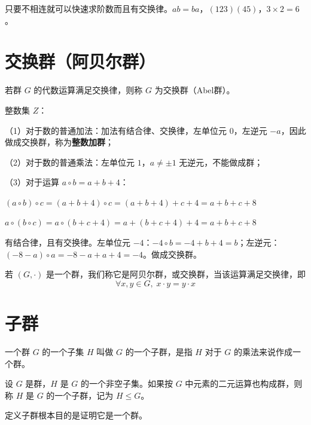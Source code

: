\begin{note}[阶数与奇偶]
只要不相连就可以快速求阶数而且有交换律。$ab=ba$，$(123)(45)$，$3\times2=6$。
\end{note}

\section{交换群（阿贝尔群）}

\begin{definition}[交换群]
若群 $G$ 的代数运算满足交换律，则称 $G$ 为交换群（Abel群）。
\end{definition}

\begin{example}
整数集 $Z$：

（1）对于数的普通加法：加法有结合律、交换律，左单位元 $0$，左逆元 $-a$，因此做成交换群，称为\textbf{整数加群}；

（2）对于数的普通乘法：左单位元 $1$，$a\ne\pm1$ 无逆元，不能做成群；

（3）对于运算 $a\circ b=a+b+4$：

$(a\circ b)\circ c=(a+b+4)\circ c=(a+b+4)+c+4=a+b+c+8$

$a\circ(b\circ c)=a\circ(b+c+4)=a+(b+c+4)+4=a+b+c+8$

有结合律，且有交换律。左单位元 $-4$：$-4\circ b=-4+b+4=b$；左逆元：$(-8-a)\circ a=-8-a+a+4=-4$。做成交换群。
\end{example}

\begin{definition}[定义 1.10：阿贝尔群]
若 $(G,\cdot)$ 是一个群，我们称它是阿贝尔群，或交换群，当该运算满足交换律，即
\[
\forall x,y\in G,\;x\cdot y=y\cdot x
\]
\end{definition}

\section{子群}

\begin{definition}[子群]
一个群 $G$ 的一个子集 $H$ 叫做 $G$ 的一个子群，是指 $H$ 对于 $G$ 的乘法来说作成一个群。

设 $G$ 是群，$H$ 是 $G$ 的一个非空子集。如果按 $G$ 中元素的二元运算也构成群，则称 $H$ 是 $G$ 的一个子群，记为 $H\le G$。
\end{definition}

\begin{note}[定义子群的目的（定义 1.13）]
定义子群根本目的是证明它是一个群。
\end{note}

